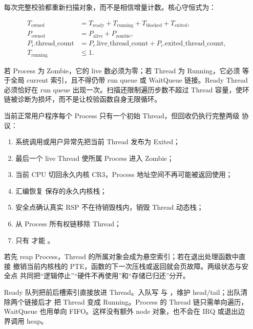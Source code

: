 每次完整校验都重新扫描对象，而不是相信增量计数。核心守恒式为：

\[
\begin{aligned}
T_{\mathrm{owned}} &=
T_{\mathrm{ready}}+T_{\mathrm{running}}+
T_{\mathrm{blocked}}+T_{\mathrm{exited}},\\
P_{\mathrm{owned}} &=P_{\mathrm{alive}}+P_{\mathrm{zombie}},\\
P_i.\mathrm{thread\_count} &=
P_i.\mathrm{live\_thread\_count}+
P_i.\mathrm{exited\_thread\_count},\\
T_{\mathrm{running}} &\le 1.
\end{aligned}
\]

若 Process 为 Zombie，它的 live 数必须为零；若 Thread 为 Running，它必须
等于全局 current 索引，且不得仍带 run queue 或 WaitQueue 链接。Ready
Thread 必须恰好在 run queue 出现一次。扫描还限制遍历步数不超过 Thread
容量，使环链被诊断为损坏，而不是让校验函数自身无限循环。

当前正常用户程序每个 Process 只有一个初始 Thread，但回收仍执行完整两级
协议：

\begin{enumerate}[label=\arabic*.]
  \item 系统调用或用户异常先把当前 Thread 发布为 Exited；
  \item 最后一个 live Thread 使所属 Process 进入 Zombie；
  \item 当前 CPU 切回永久内核 CR3，Process 地址空间不再可能被返回使用；
  \item 汇编恢复  保存的永久内核栈；
  \item 安全点确认真实 RSP 不在待销毁栈内，销毁 Thread 动态栈；
  \item {} 从 Process 所有权链移除 Thread；
  \item 只有  才能 。
\end{enumerate}

若先 reap Process，Thread 的所属对象会成为悬空索引；若在退出处理函数中直接
撤销当前内核栈的 PTE，函数的下一次压栈或返回就会页故障。两级状态与安全点
共同把“逻辑停止”“硬件不再使用”和“存储已归还”分开。

Ready 队列把前后槽索引直接放进 Thread。入队写
 与
，维护 head/tail；出队清除两个链接后才
把 Thread 变成 Running。Process 的 Thread 链只需单向遍历，WaitQueue
也用单向 FIFO。这样没有额外 node 对象，也不会在 IRQ 或退出边界调用 heap。

